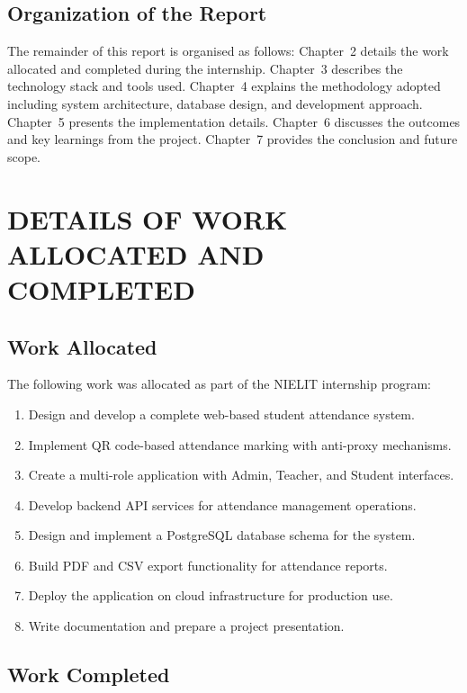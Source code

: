\documentclass{SOICTthesis}
\begin{document}
\section{Organization of the Report}
\label{sec:organization}

The remainder of this report is organised as follows: Chapter~2 details the work allocated and completed during the internship. Chapter~3 describes the technology stack and tools used. Chapter~4 explains the methodology adopted including system architecture, database design, and development approach. Chapter~5 presents the implementation details. Chapter~6 discusses the outcomes and key learnings from the project. Chapter~7 provides the conclusion and future scope.


\chapter{DETAILS OF WORK ALLOCATED AND COMPLETED}
\label{ch:work_details}

\section{Work Allocated}
\label{sec:work_allocated}

The following work was allocated as part of the NIELIT internship program:

\begin{enumerate}
    \item Design and develop a complete web-based student attendance system.
    \item Implement QR code-based attendance marking with anti-proxy mechanisms.
    \item Create a multi-role application with Admin, Teacher, and Student interfaces.
    \item Develop backend API services for attendance management operations.
    \item Design and implement a PostgreSQL database schema for the system.
    \item Build PDF and CSV export functionality for attendance reports.
    \item Deploy the application on cloud infrastructure for production use.
    \item Write documentation and prepare a project presentation.
\end{enumerate}

\section{Work Completed}
\label{sec:work_completed}
\end{document}
